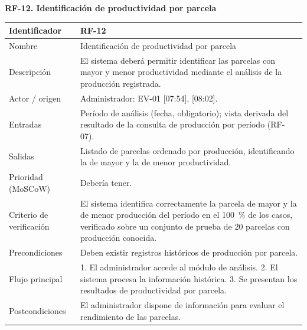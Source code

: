 \documentclass[12pt,a4paper]{article}
\begin{document}
\begin{minipage}{\linewidth}
\bigskip
\noindent\textbf{RF-12. Identificación de productividad por parcela}
\label{tab:RF-12}

\begin{center}
\begin{tabular}{|p{3.5cm}|p{10.7cm}|}
\hline
Identificador & RF-12 \\
\hline
Nombre & Identificación de productividad por parcela \\
\hline
Descripción & El sistema deberá permitir identificar las parcelas con mayor y menor productividad mediante el análisis de la producción registrada. \\
\hline
Actor / origen & Administrador: EV-01 [07:54], [08:02]. \\
\hline
Entradas & Período de análisis (fecha, obligatorio); vista derivada del resultado de la consulta de producción por período (RF-07). \\
\hline
Salidas & Listado de parcelas ordenado por producción, identificando la de mayor y la de menor productividad. \\
\hline
Prioridad (MoSCoW) & Debería tener. \\
\hline
Criterio de verificación & El sistema identifica correctamente la parcela de mayor y la de menor producción del período en el 100~\% de los casos, verificado sobre un conjunto de prueba de 20 parcelas con producción conocida. \\
\hline
Precondiciones & Deben existir registros históricos de producción por parcela. \\
\hline
Flujo principal & 1. El administrador accede al módulo de análisis. 2. El sistema procesa la información histórica. 3. Se presentan los resultados de productividad por parcela. \\
\hline
Postcondiciones & El administrador dispone de información para evaluar el rendimiento de las parcelas. \\
\hline
\end{tabular}
\end{center}
\end{minipage}
\end{document}
